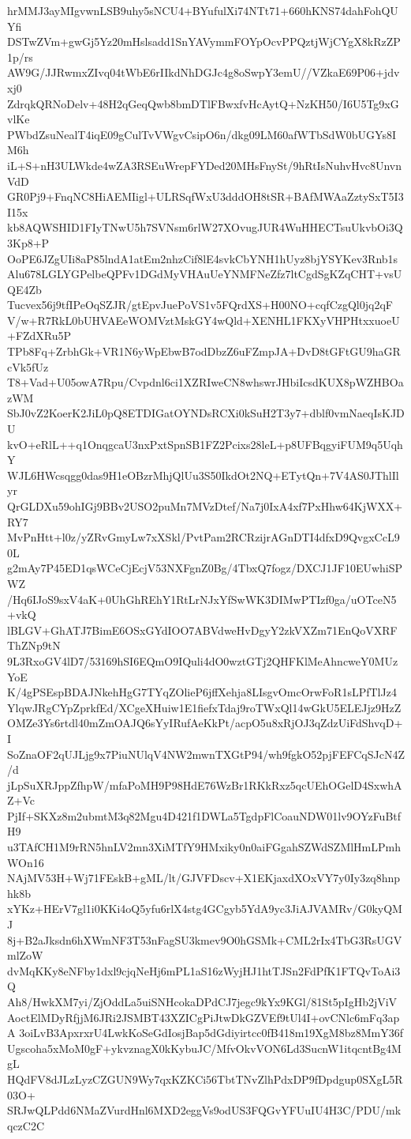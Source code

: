 hrMMJ3ayMIgvwnLSB9uhy5sNCU4+BYufulXi74NTt71+660hKNS74dahFohQUYfi
DSTwZVm+gwGj5Yz20mHslsadd1SnYAVymmFOYpOcvPPQztjWjCYgX8kRzZP1p/rs
AW9G/JJRwmxZIvq04tWbE6rIIkdNhDGJc4g8oSwpY3emU//VZkaE69P06+jdvxj0
ZdrqkQRNoDelv+48H2qGeqQwb8bmDTlFBwxfvHcAytQ+NzKH50/I6U5Tg9xGvlKe
PWbdZsuNealT4iqE09gCulTvVWgvCsipO6n/dkg09LM60afWTbSdW0bUGYs8IM6h
iL+S+nH3ULWkde4wZA3RSEuWrepFYDed20MHsFnySt/9hRtIsNuhvHvc8UnvnVdD
GR0Pj9+FnqNC8HiAEMIigl+ULRSqfWxU3dddOH8tSR+BAfMWAaZztySxT5I3I15x
kb8AQWSHID1FIyTNwU5h7SVNsm6rlW27XOvugJUR4WuHHECTsuUkvbOi3Q3Kp8+P
OoPE6JZgUIi8aP85lndA1atEm2nhzCif8lE4svkCbYNH1hUyz8bjYSYKev3Rnb1s
Alu678LGLYGPelbeQPFv1DGdMyVHAuUeYNMFNeZfz7ltCgdSgKZqCHT+vsUQE4Zb
Tucvex56j9tfIPeOqSZJR/gtEpvJuePoVS1v5FQrdXS+H00NO+cqfCzgQl0jq2qF
V/w+R7RkL0bUHVAEeWOMVztMskGY4wQld+XENHL1FKXyVHPHtxxuoeU+FZdXRu5P
TPb8Fq+ZrbhGk+VR1N6yWpEbwB7odDbzZ6uFZmpJA+DvD8tGFtGU9haGRcVk5fUz
T8+Vad+U05owA7Rpu/Cvpdnl6ci1XZRIweCN8whswrJHbiIcsdKUX8pWZHBOazWM
SbJ0vZ2KoerK2JiL0pQ8ETDIGatOYNDsRCXi0kSuH2T3y7+dblf0vmNaeqIsKJDU
kvO+eRlL++q1OnqgcaU3nxPxtSpnSB1FZ2Pcixs28leL+p8UFBqgyiFUM9q5UqhY
WJL6HWcsqgg0das9H1eOBzrMhjQlUu3S50IkdOt2NQ+ETytQn+7V4AS0JThlIlyr
QrGLDXu59ohIGj9BBv2USO2puMn7MVzDtef/Na7j0IxA4xf7PxHhw64KjWXX+RY7
MvPnHtt+l0z/yZRvGmyLw7xXSkl/PvtPam2RCRzijrAGnDTI4dfxD9QvgxCcL90L
g2mAy7P45ED1qsWCeCjEcjV53NXFgnZ0Bg/4TbxQ7fogz/DXCJ1JF10EUwhiSPWZ
/Hq6IJoS9sxV4aK+0UhGhREhY1RtLrNJxYfSwWK3DIMwPTIzf0ga/uOTceN5+vkQ
lBLGV+GhATJ7BimE6OSxGYdIOO7ABVdweHvDgyY2zkVXZm71EnQoVXRFThZNp9tN
9L3RxoGV4lD7/53169hSI6EQmO9IQuli4dO0wztGTj2QHFKlMeAhncweY0MUzYoE
K/4gPSEspBDAJNkehHgG7TYqZOlieP6jffXehja8LIsgvOmcOrwFoR1sLPfTlJz4
YlqwJRgCYpZprkfEd/XCgeXHuiw1E1fiefxTdaj9roTWxQl14wGkU5ELEJjz9HzZ
OMZe3Ys6rtdl40mZmOAJQ6sYyIRufAeKkPt/acpO5u8xRjOJ3qZdzUiFdShvqD+I
SoZnaOF2qUJLjg9x7PiuNUlqV4NW2mwnTXGtP94/wh9fgkO52pjFEFCqSJcN4Z/d
jLpSuXRJppZfhpW/mfaPoMH9P98HdE76WzBr1RKkRxz5qcUEhOGelD4SxwhAZ+Vc
PjIf+SKXz8m2ubmtM3q82Mgu4D421f1DWLa5TgdpFlCoauNDW01lv9OYzFuBtfH9
u3TAfCH1M9rRN5hnLV2mn3XiMTfY9HMxiky0n0aiFGgahSZWdSZMlHmLPmhWOn16
NAjMV53H+Wj71FEskB+gML/lt/GJVFDscv+X1EKjaxdXOxVY7y0Iy3zq8hnphk8b
xYKz+HErV7gl1i0KKi4oQ5yfu6rlX4stg4GCgyb5YdA9yc3JiAJVAMRv/G0kyQMJ
8j+B2aJksdn6hXWmNF3T53nFagSU3kmev9O0hGSMk+CML2rIx4TbG3RsUGVmlZoW
dvMqKKy8eNFby1dxl9cjqNeHj6mPL1aS16zWyjHJ1htTJSn2FdPfK1FTQvToAi3Q
Ah8/HwkXM7yi/ZjOddLa5uiSNHcokaDPdCJ7jegc9kYx9KGl/81St5pIgHb2jViV
AoctElMDyRfjjM6JRi2JSMBT43XZICgPiJtwDkGZVEf9tUl4I+ovCNlc6mFq3apA
3oiLvB3ApxrxrU4LwkKoSeGdIosjBap5dGdiyirtcc0fB418m19XgM8bz8MmY36f
Ugscoha5xMoM0gF+ykvznagX0kKybuJC/MfvOkvVON6Ld3SucnW1itqcntBg4MgL
HQdFV8dJLzLyzCZGUN9Wy7qxKZKCi56TbtTNvZlhPdxDP9fDpdgup0SXgL5R03O+
SRJwQLPdd6NMaZVurdHnl6MXD2eggVs9odUS3FQGvYFUuIU4H3C/PDU/mkqczC2C
